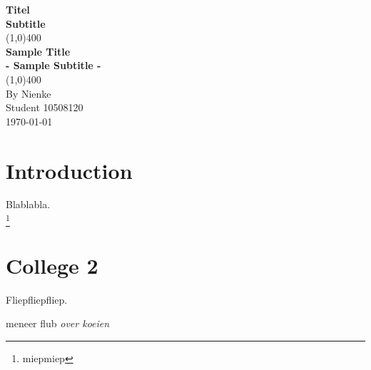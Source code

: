 \documentclass[11pt,a4paper]{article}
\begin{document}
\begin{titlepage}
\begin{center}
\vspace{1cm}
\Large{\textbf{Titel}}\\
\Large{\textbf{Subtitle}}\\
\vfill
\line(1,0){400}\\ [1mm]
\huge{\textbf{Sample Title}}\\ [3mm]
\Large{\textbf{- Sample Subtitle -}} \\ [1mm]
\line(1,0){400}\\
\vfill
By Nienke \\
Student 10508120 \\
\today \\
\end{center}
\end{titlepage}

\tableofcontents
\thispagestyle{empty}
\clearpage
\setcounter{page}{1}

\section{Introduction}
Blablabla. \cite{wikipedia}\\
\footnote{miepmiep}
\clearpage

\section{College 2}


Fliepfliepfliep.

\vfill

\pagebreak
\begin{thebibliography}{}

meneer flub
\textit{over koeien}
\end{thebibliography}
\end{document}
